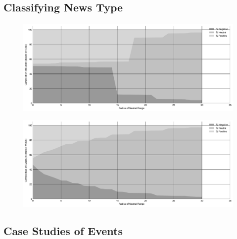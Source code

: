 \documentclass[12pt]{article}
\begin{document}
	\subsection{Classifying News Type}
	\paragraph{}
	\begin{figure}[H]
		\centering
		\includegraphics[width=\linewidth]{figures/event_classification/ESS_composition.png}
	\end{figure}
	
	\begin{figure}[H]
		\centering
		\includegraphics[width=\linewidth]{figures/event_classification/WESS_composition.png}
	\end{figure}

	
	\subsection{Case Studies of Events}
\end{document}
